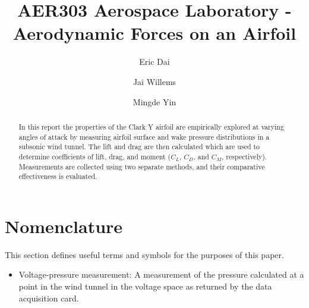 \documentclass[runningheads]{llncs}
\begin{document}
\title{AER303 Aerospace Laboratory - Aerodynamic Forces on an Airfoil}

\author{Eric Dai \and Jai Willems \and Mingde Yin}


\maketitle




\begin{abstract}

In this report the properties of the Clark Y airfoil are empirically explored at varying angles of attack by measuring airfoil surface and wake pressure distributions in a subsonic wind tunnel. The lift and drag are then calculated which are used to determine coefficients of lift, drag, and moment ($C_L$, $C_D$, and $C_M$, respectively). Measurements are collected using two separate methods, and their comparative effectiveness is evaluated.

\end{abstract}




\section*{Nomenclature}

This section defines useful terms and symbols for the purposes of this paper.

\begin{itemize}
    \item Voltage-pressure measurement: A measurement of the pressure calculated at a point in the wind tunnel in the voltage space as returned by the data acquisition card.
\end{itemize}
\end{document}
